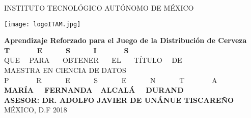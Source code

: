 
\begin{titlepage}
\begin{center}
\Large {INSTITUTO TECNOLÓGICO AUTÓNOMO DE MÉXICO}

 \vspace{0.5 cm}
  \centering
    \texttt{[image: logoITAM.jpg]}

 \vspace{0.5 cm}
 \textbf{Aprendizaje Reforzado para el Juego de la Distribuci\'on de Cerveza}
  \vspace{2 cm}\\
  \Huge{\textbf{T \ \ \ \ \ \ E \ \ \ \ \ S \ \ \ \ \ I \ \ \ \ \ \ S}}
    \vspace{.4cm}\\
  \Large{QUE  \ \ PARA \ \ \ OBTENER \ \ \ EL \ \ \ TÍTULO \ \ DE 
   \vspace{.4cm}\\
  MAESTRA EN CIENCIA DE DATOS 
   \vspace{.4cm}\\
  P \ \ \ \ \ \ \ R \ \ \ \ \ \ E \ \ \ \ \ \ S \ \ \ \ \ \ E \ \ \ \ \ \ N \ \ \ \ \ \ T \ \ \ \ \ \ \ A 
   \vspace{.4cm}\\
 \textbf{MAR\'IA \ \ FERNANDA\ \ ALCAL\'A \ \ DURAND}}
    \vspace{1 cm}\\
\normalsize \textbf{ASESOR: DR. ADOLFO JAVIER DE UN\'ANUE TISCARE\~NO}
\vspace{1cm}\\
MÉXICO, D.F \hfill{2018}
\end{center}
\end{titlepage}

